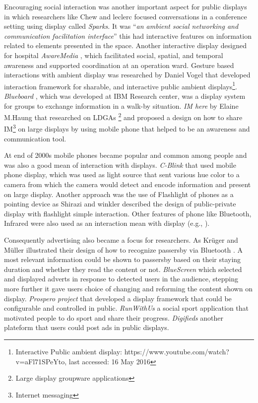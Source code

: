 Encouraging social interaction was another important aspect for public displays in which researchers like Chew and leclerc \cite{chew_interaction} focused conversations in a conference setting using display called \emph{Sparks}. It was ``\emph{an ambient social networking and communication facilitation interface}'' this had interactive features on information related to elements presented in the space. Another interactive display designed for hospital \emph{AwareMedia} \cite{ interactive_hospital}, which facilitated  social, spatial, and temporal awareness and supported coordination at an operation ward. Gesture based interactions with ambient display was researched by Daniel Vogel \cite{vogel} that developed interaction framework for sharable, and interactive public ambient displays\footnote{Interactive Public ambient display:  https://www.youtube.com/watch?v=aFl71SPeYto, last accessed: 16 May 2016}. \emph{Blueboard} \cite{blueboard}, which was developed at IBM Research center, was a display system for groups to exchange information in a walk-by situation. \emph{IM here} \cite{ imahere} by Elaine M.Haung that researched on LDGAs \footnote{Large display groupware applications} and proposed a design on how to share IM\footnote{Internet messaging} on large displays by using mobile phone that helped to be an awareness and communication tool.

At end of 2000s mobile phones became popular and common among people and was also a good mean of interaction with displays. \emph{C-Blink} \cite{cblink} that used mobile phone display, which was used as light source that sent various hue color to a camera from which the camera would detect and encode information and present on large display. Another approach was the use of Flashlight of phones as a pointing device as Shirazi and winkler \cite{flashlight} described the design of public-private display with flashlight simple interaction. Other features of phone like Bluetooth, Infrared were also used as an interaction mean with display (e.g., \cite{bluetooth2, Bluetooth}).

Consequently advertising also became a focus for researchers. As Krüger and Müller illustrated their design of how to recognize passersby via Bluetooth \cite{toward_situated}. A most relevant information could be shown to passersby based on their staying duration and whether they read the content or not. \emph{BlueScreen} \cite{bluescreen} which selected and displayed adverts in response to detected users in the audience, stepping more further it gave users choice of changing and reforming the content shown on display. \emph{Prospero project} \cite{prospero} that developed a display framework that could be configurable and controlled in public.  \emph{RunWithUs} \cite{runwithuse} a social sport application that motivated people to do sport and share their progress. \emph{Digifieds} \cite{digifieds} another plateform that users could post ads in public displays.


